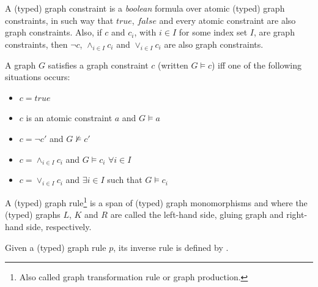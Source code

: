 \begin{definition} A (typed) graph constraint is a \emph{boolean} formula over atomic (typed) graph constraints, in such way that $true$, $false$ and every atomic constraint are also graph constraints. Also, if $c$ and $c_i$, with $i \in I$ for some index set $I$, are graph constraints, then $\neg c$, $\land_{i \in I} c_i$ and $\lor_{i \in I} c_i$ are also graph constraints.

  A graph $G$ satisfies a graph constraint $c$ (written $G \models c$) iff one of the following situations occurs:
  \begin{itemize}
    \item $c = true$
    \item $c$ is an atomic constraint $a$ and $G \models a$
    \item $c = \neg c'$ and $G \not\models c'$
    \item $c = \land_{i \in I}c_i$ and $G \models c_i$ $\forall i \in I$ 
    \item $c = \lor_{i \in I}c_i$  and $\exists i \in I$ such that $G \models c_i$
  \end{itemize}
\end{definition}

\begin{example}
\end{example}
\fi

\begin{definition}\label{def:graph-rule} A (typed) graph rule\footnote{Also called graph transformation rule or graph production.} \graphrule{} is a span of (typed) graph monomorphisms \lefthand{} and \righthand{}  where the (typed) graphs $L$, $K$ and $R$ are called the left-hand side, gluing graph and right-hand side, respectively. 

  Given a (typed) graph rule $p$, its inverse rule is defined by \inversegraphrule.
\end{definition}


